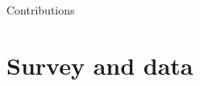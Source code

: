\documentclass[aspectratio=169,9pt,dvipsnames]{beamer}
\begin{document}
\begin{frame}{Contributions}

    \end{frame}
\section{Survey and data}




     
    
\end{document}
